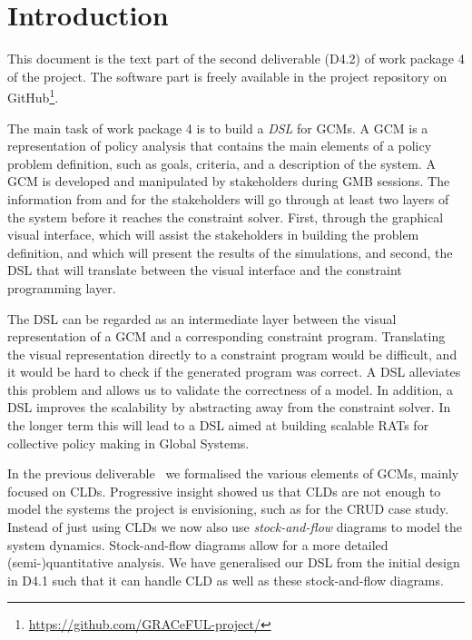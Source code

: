 \section{Introduction}\label{introduction}

This document is the text part of the second deliverable (D4.2) of
work package 4 of the \grace project.
%
The software part is freely available in the project repository on
GitHub\footnote{\url{https://github.com/GRACeFUL-project/}}.

The main task of work package 4 is to build a \emph{\ac{DSL}} for
\acp{GCM}.
%
A \ac{GCM} is a representation of policy analysis that contains the
main elements of a policy problem definition, such as goals, criteria,
and a description of the system.
%
A \ac{GCM} is developed and manipulated by stakeholders during
\ac{GMB} sessions.
%
The information from and for the stakeholders will go through at least
two layers of the \grace system before it reaches the constraint
solver.
%
First, through the graphical visual interface, which will assist the
stakeholders in building the problem definition, and which will
present the results of the simulations, and second, the \ac{DSL} that
will translate between the visual interface and the constraint
programming layer.

The \ac{DSL} can be regarded as an intermediate layer between the
visual representation of a \acf{GCM} and a corresponding constraint
program.
%
Translating the visual representation directly to a constraint program
would be difficult, and it would be hard to check if the generated
program was correct.
%
A DSL alleviates this problem and allows us to validate the
correctness of a model.
%
In addition, a \ac{DSL} improves the scalability by abstracting away
from the constraint solver.
%
In the longer term this will lead to a \ac{DSL} aimed at building
scalable \acp{RAT} for collective policy making in Global Systems.


In the previous deliverable~\cite{D4.1} we formalised the various
elements of \acp{GCM}, mainly focused on \acp{CLD}.
%
Progressive insight showed us that \acp{CLD} are not enough to model
the systems the project is envisioning, such as for the \ac{CRUD} case
study.
%
Instead of just using \aclp{CLD} we now also use \emph{stock-and-flow}
diagrams to model the system dynamics.
%
Stock-and-flow diagrams allow for a more detailed (semi-)quantitative
analysis.
%
We have generalised our DSL from the initial design in D4.1 such that
it can handle \acl{CLD} as well as these stock-and-flow diagrams.

